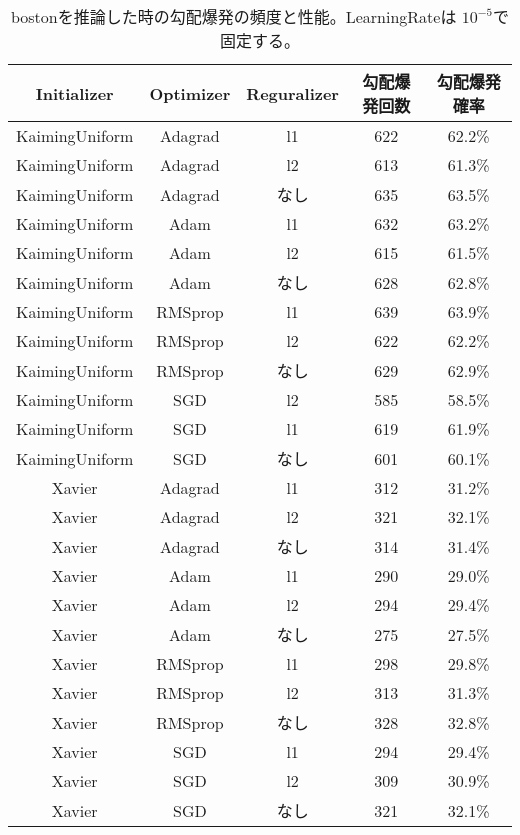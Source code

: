 \begin{table}[htbp]
    \begin{center}
        \caption{bostonを推論した時の勾配爆発の頻度と性能。LearningRateは $ 10^{-5} $で固定する。 }
        \label{appendix:errorcount_table}
        \vspace{2mm} 
        \begin{tabular}{ |c|c|c|c|c| }
        \hline
        Initializer & Optimizer &  Reguralizer & 勾配爆発回数 & 勾配爆発確率 \\
        \hline
        KaimingUniform & Adagrad & l1 & 622 & 62.2\% \\
        \hline
        KaimingUniform & Adagrad & l2 & 613 & 61.3\% \\
        \hline
        KaimingUniform & Adagrad & なし & 635 & 63.5\% \\
        \hline
        KaimingUniform & Adam & l1 & 632 & 63.2\% \\
        \hline
        KaimingUniform & Adam & l2 & 615 & 61.5\% \\
        \hline
        KaimingUniform & Adam & なし & 628 & 62.8\% \\
        \hline
        KaimingUniform & RMSprop & l1 & 639 & 63.9\% \\
        \hline
        KaimingUniform & RMSprop & l2 & 622 & 62.2\% \\
        \hline
        KaimingUniform & RMSprop & なし & 629 & 62.9\% \\
        \hline
        KaimingUniform & SGD & l2 & 585 & 58.5\% \\
        \hline
        KaimingUniform & SGD & l1 & 619 & 61.9\% \\
        \hline
        KaimingUniform & SGD & なし & 601 & 60.1\% \\
        \hline
        Xavier & Adagrad & l1 & 312 & 31.2\% \\
        \hline
        Xavier & Adagrad & l2 & 321 & 32.1\% \\
        \hline
        Xavier & Adagrad & なし & 314 & 31.4\% \\
        \hline
        Xavier & Adam & l1 & 290 & 29.0\% \\
        \hline
        Xavier & Adam & l2 & 294 & 29.4\% \\
        \hline
        Xavier & Adam & なし & 275 & 27.5\% \\
        \hline
        Xavier & RMSprop & l1 & 298 & 29.8\% \\
        \hline
        Xavier & RMSprop & l2 & 313 & 31.3\% \\
        \hline
        Xavier & RMSprop & なし & 328 & 32.8\% \\
        \hline
        Xavier & SGD & l1 & 294 & 29.4\% \\
        \hline
        Xavier & SGD & l2 & 309 & 30.9\% \\
        \hline
        Xavier & SGD & なし & 321 & 32.1\% \\
        \hline
        \end{tabular}
    \end{center}
\end{table}
